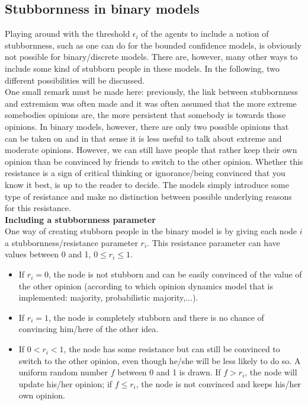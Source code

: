 \documentclass[11 pt , letterpaper , twoside , openright]{book}
\begin{document}
\subsection{Stubbornness in binary models}
\label{stubbBin}
Playing around with the threshold $\epsilon_i$ of the agents to include a notion of stubbornness, such as one can do for the bounded confidence models, is obviously not possible for binary/discrete models. There are, however, many other ways to include some kind of stubborn people in these models. In the following, two different possibilities will be discussed. \\
One small remark must be made here: previously, the link between stubbornness and extremism was often made and it was often assumed that the more extreme somebodies opinions are, the more persistent that somebody is towards those opinions. In binary models, however, there are only two possible opinions that can be taken on and in that sense it is less useful to talk about extreme and moderate opinions. However, we can still have people that rather keep their own opinion than be convinced by friends to switch to the other opinion. Whether this resistance is a sign of critical thinking or ignorance/being convinced that you know it best, is up to the reader to decide. The models simply introduce some type of resistance and make no distinction between possible underlying reasons for this resistance.\\
\newline
\textbf{Including a stubbornness parameter}\\
\newline
One way of creating stubborn people in the binary model is by giving each node $i$ a stubbornness/resistance parameter $r_i$. This resistance parameter can have values between 0 and 1, $0 \leqslant r_i \leqslant 1$. 
\begin{itemize}
	\item If $r_i = 0$, the node is not stubborn and can be easily convinced of the value of the other opinion (according to which opinion dynamics model that is implemented: majority, probabilistic majority,...).
	\item If $r_i = 1$, the node is completely stubborn and there is no chance of convincing him/here of the other idea.
	\item If $0 < r_i < 1$, the node has some resistance but can still be convinced to switch to the other opinion, even though he/she will be less likely to do so. A uniform random number $f$ between 0 and 1 is drawn. If $f > r_i$, the node will update his/her opinion; if $f \leqslant r_i$, the node is not convinced and keeps his/her own opinion.
\end{itemize}
\end{document}
